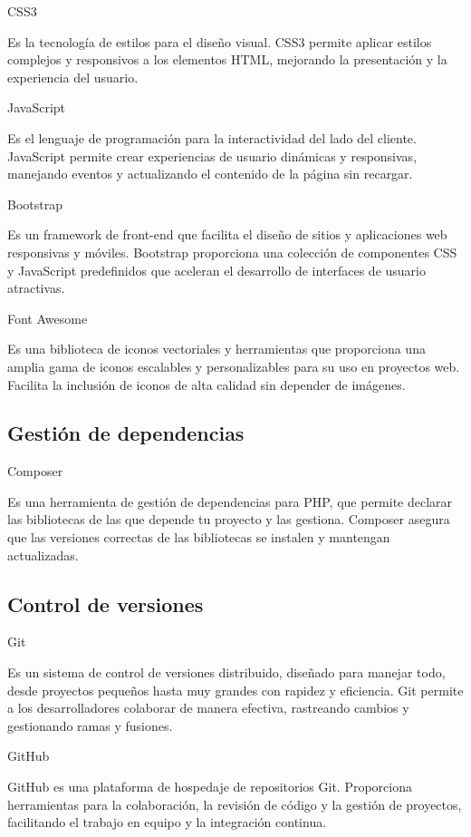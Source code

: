 CSS3

Es la tecnología de estilos para el diseño visual. CSS3 permite aplicar
estilos complejos y responsivos a los elementos HTML, mejorando la presentación y la experiencia del usuario.

JavaScript

Es el lenguaje de programación para la interactividad del lado
del cliente. JavaScript permite crear experiencias de usuario dinámicas y
responsivas, manejando eventos y actualizando el contenido de la página sin recargar.

Bootstrap

Es un framework de front-end que facilita el diseño de sitios y aplicaciones web
responsivas y móviles. Bootstrap proporciona una colección de componentes CSS
y JavaScript predefinidos que aceleran el desarrollo de interfaces de usuario atractivas.

Font Awesome

Es una biblioteca de iconos vectoriales y herramientas que proporciona una amplia gama de
iconos escalables y personalizables para su uso en proyectos web.
Facilita la inclusión de iconos de alta calidad sin depender de imágenes.

\subsection{Gestión de dependencias}

Composer

Es una herramienta de gestión de dependencias para PHP, que
permite declarar las bibliotecas de las que depende tu proyecto
y las gestiona. Composer asegura que las versiones correctas de las bibliotecas se instalen y mantengan actualizadas.

\subsection{Control de versiones}

Git

Es un sistema de control de versiones distribuido, diseñado para manejar todo, desde proyectos
pequeños hasta muy grandes con rapidez y eficiencia. Git permite
a los desarrolladores colaborar de manera efectiva, rastreando cambios y gestionando ramas y fusiones.


GitHub

GitHub es una plataforma de hospedaje de repositorios Git. Proporciona herramientas para
la colaboración, la revisión de código y la gestión de proyectos, facilitando el trabajo en equipo y la
integración continua.

